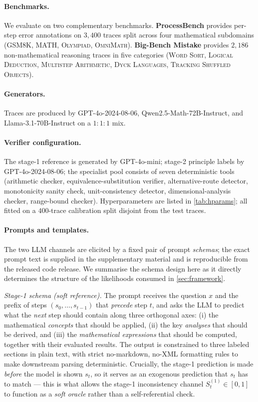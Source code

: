 \documentclass[11pt,a4paper]{article}
\theoremstyle{plain}
\theoremstyle{definition}
\theoremstyle{remark}
\begin{document}
\paragraph{Benchmarks.}
We evaluate on two complementary benchmarks. \textbf{ProcessBench}
\citep{zheng2024processbench} provides per-step error annotations on
$3{,}400$ traces split across four mathematical subdomains
(\textsc{GSM8K}, \textsc{MATH}, \textsc{Olympiad}, \textsc{OmniMath}).
\textbf{Big-Bench Mistake} \citep{tyen2024llms} provides $2{,}186$
non-mathematical reasoning traces in five categories
(\textsc{Word Sort}, \textsc{Logical Deduction},
\textsc{Multistep Arithmetic}, \textsc{Dyck Languages},
\textsc{Tracking Shuffled Objects}).

\paragraph{Generators.}
Traces are produced by GPT-4o-2024-08-06, Qwen2.5-Math-72B-Instruct,
and Llama-3.1-70B-Instruct on a $1{:}1{:}1$ mix.

\paragraph{Verifier configuration.}
The stage-1 reference is generated by GPT-4o-mini; stage-2 principle
labels by GPT-4o-2024-08-06; the specialist pool consists of seven
deterministic tools (arithmetic checker, equivalence-substitution
verifier, alternative-route detector, monotonicity sanity check,
unit-consistency detector, dimensional-analysis checker,
range-bound checker). Hyperparameters are listed in
\cref{tab:hparams}; all fitted on a $400$-trace calibration split
disjoint from the test traces.

\paragraph{Prompts and templates.}
The two LLM channels are elicited by a fixed pair of prompt
\emph{schemas}; the exact prompt text is supplied in the
supplementary material and is reproducible from the released code
release. We summarise the schema design here as it directly
determines the structure of the likelihoods consumed in
\cref{sec:framework}.

\emph{Stage-1 schema (soft reference).} The prompt receives the
question $x$ and the prefix of steps $(s_0, \dots, s_{t-1})$ that
\emph{precede} step $t$, and asks the LLM to predict what the
\emph{next} step should contain along three orthogonal axes:
(i) the mathematical \textit{concepts} that should be applied,
(ii) the key \textit{analyses} that should be derived, and
(iii) the \textit{mathematical expressions} that should be
computed, together with their evaluated results. The output is
constrained to three labeled sections in plain text, with strict
no-markdown, no-XML formatting rules to make downstream parsing
deterministic. Crucially, the stage-1 prediction is made
\emph{before} the model is shown $s_t$, so it serves as an
exogenous prediction that $s_t$ has to match --- this is what
allows the stage-1 inconsistency channel $S^{(1)}_t \in [0,1]$ to
function as a \emph{soft oracle} rather than a self-referential
check.
\end{document}
